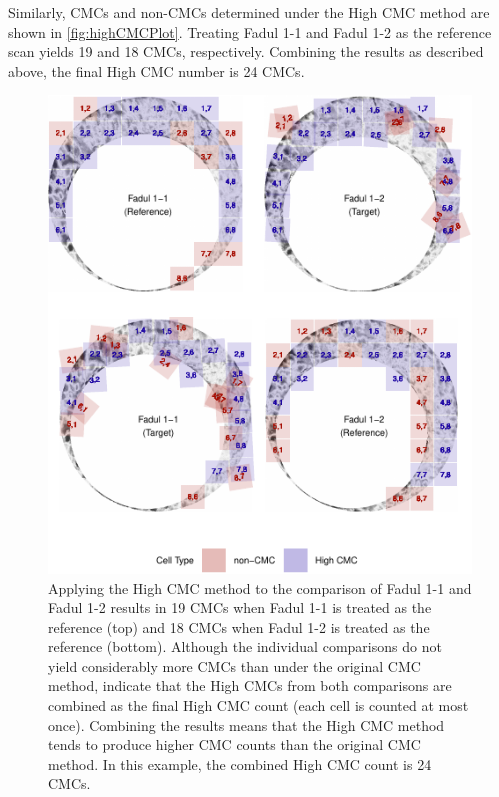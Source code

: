 Similarly, CMCs and non-CMCs determined under the High CMC method are
shown in \autoref{fig:highCMCPlot}. Treating Fadul 1-1 and Fadul 1-2 as
the reference scan yields 19 and 18 CMCs, respectively. Combining the
results as described above, the final High CMC number is 24 CMCs.

\begin{Schunk}
\begin{figure}[htbp]

{\centering \includegraphics[width=\textwidth]{figures/kmHighCMC} 

}

\caption{\label{fig:highCMCPlot} Applying the High CMC method to the comparison of Fadul 1-1 and Fadul 1-2 results in 19 CMCs when Fadul 1-1 is treated as the reference (top) and 18 CMCs when Fadul 1-2 is treated as the reference (bottom). Although the individual comparisons do not yield considerably more CMCs than under the original CMC method, \citet{tong_improved_2015} indicate that the High CMCs from both comparisons are combined as the final High CMC count (each cell is counted at most once). Combining the results means that the High CMC method tends to produce higher CMC counts than the original CMC method. In this example, the combined High CMC count is 24 CMCs.}\label{fig:unnamed-chunk-17}
\end{figure}
\end{Schunk}

